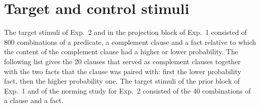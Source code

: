 \documentclass[11pt,fleqn]{article}
\newcommand{\6}{\mbox{$[\hspace*{-.6mm}[$}}
\newcommand{\9}{\mbox{$]\hspace*{-.6mm}]$}}
\begin{document}
\section{Target and control stimuli}\label{a-stim}

The target stimuli of Exp.~2 and in the projection block of Exp.~1 consisted of 800 combinations of a predicate, a complement clause and a fact relative to which the content of the complement clause had a higher or lower probability. The following list gives the 20 clauses that served as complement clauses together with the two facts that the clause was paired with: first the lower probability fact, then the higher probability one. The target stimuli of the prior block of Exp.~1 and of the norming study for Exp.~2 consisted of the 40 combinations of a clause and a fact.
\end{document}
